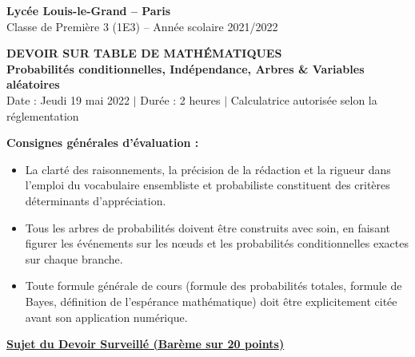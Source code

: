 \documentclass[11pt,a4paper]{article}
\begin{document}
\begin{center}
    {\LARGE \bfseries Lycée Louis-le-Grand -- Paris}\\[0.2cm]
    {\large Classe de Première 3 (1E3) -- Année scolaire 2021/2022}\\[0.3cm]
    \begin{tcolorbox}[colback=llglight,colframe=llgblue,arc=3mm,boxrule=1.2pt,center]
        \begin{center}
            {\Large \bfseries \color{llgblue} DEVOIR SUR TABLE DE MATHÉMATIQUES}\\[0.15cm]
            {\large \bfseries Probabilités conditionnelles, Indépendance, Arbres \& Variables aléatoires}\\[0.2cm]
            \small Date : Jeudi 19 mai 2022 \quad $\vert$ \quad Durée : 2 heures \quad $\vert$ \quad Calculatrice autorisée selon la réglementation
        \end{center}
    \end{tcolorbox}
\end{center}

\vspace{0.3cm}

\begin{tcolorbox}[colback=white,colframe=llgblue!60,arc=1.5mm,boxrule=0.6pt]
\small\textbf{Consignes générales d'évaluation :}
\begin{itemize}[leftmargin=*,itemsep=1pt]
    \item La clarté des raisonnements, la précision de la rédaction et la rigueur dans l'emploi du vocabulaire ensembliste et probabiliste constituent des critères déterminants d'appréciation.
    \item Tous les arbres de probabilités doivent être construits avec soin, en faisant figurer les événements sur les nœuds et les probabilités conditionnelles exactes sur chaque branche.
    \item Toute formule générale de cours (formule des probabilités totales, formule de Bayes, définition de l'espérance mathématique) doit être explicitement citée avant son application numérique.
\end{itemize}
\end{tcolorbox}

\vspace{0.4cm}

\begin{center}
    {\Large \bfseries \color{llgblue} \underline{Sujet du Devoir Surveillé (Barème sur 20 points)}}
\end{center}
\end{document}
